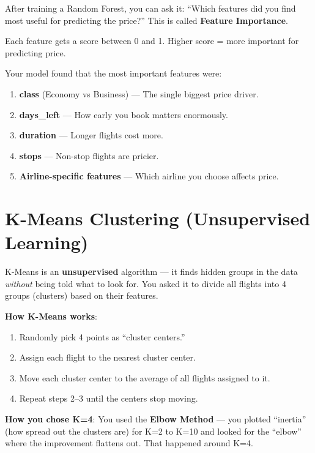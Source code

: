 \documentclass[12pt, a4paper]{article}
\begin{document}
\begin{conceptbox}
    After training a Random Forest, you can ask it: ``Which features did you find most useful for predicting the price?'' This is called \textbf{Feature Importance}.

    Each feature gets a score between 0 and 1. Higher score = more important for predicting price.
\end{conceptbox}

Your model found that the most important features were:
\begin{enumerate}
    \item \textbf{class} (Economy vs Business) — The single biggest price driver.
    \item \textbf{days\_left} — How early you book matters enormously.
    \item \textbf{duration} — Longer flights cost more.
    \item \textbf{stops} — Non-stop flights are pricier.
    \item \textbf{Airline-specific features} — Which airline you choose affects price.
\end{enumerate}


\section{K-Means Clustering (Unsupervised Learning)}

\begin{conceptbox}
    K-Means is an \textbf{unsupervised} algorithm — it finds hidden groups in the data \textit{without} being told what to look for. You asked it to divide all flights into 4 groups (clusters) based on their features.
\end{conceptbox}

\textbf{How K-Means works}:
\begin{enumerate}
    \item Randomly pick 4 points as ``cluster centers.''
    \item Assign each flight to the nearest cluster center.
    \item Move each cluster center to the average of all flights assigned to it.
    \item Repeat steps 2--3 until the centers stop moving.
\end{enumerate}

\textbf{How you chose K=4}: You used the \textbf{Elbow Method} — you plotted ``inertia'' (how spread out the clusters are) for K=2 to K=10 and looked for the ``elbow'' where the improvement flattens out. That happened around K=4.
\end{document}
